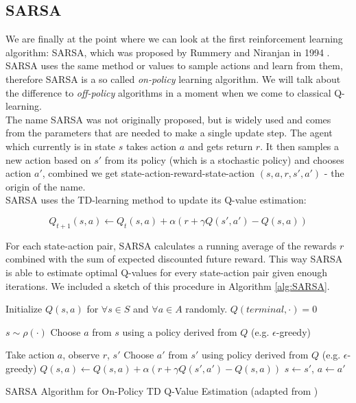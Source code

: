 \subsection{SARSA} \label{ssec:SARSA}
We are finally at the point where we can look at the first reinforcement learning algorithm: SARSA, which was proposed by Rummery and Niranjan in 1994 \cite{rummery1994line}. SARSA uses the same method or values to sample actions and learn from them, therefore SARSA is a so called \textit{on-policy} learning algorithm. We will talk about the difference to \textit{off-policy} algorithms in a moment when we come to classical Q-learning. \\ 
The name SARSA was not originally proposed, but is widely used and comes from the parameters that are needed to make a single update step. The agent which currently is in state $s$ takes action $a$ and gets return $r$. It then samples a new action based on $s'$ from its policy (which is a stochastic policy) and chooses action $a'$, combined we get  state-action-reward-state-action $(s, a, r, s', a')$ - the origin of the name. \\

SARSA uses the TD-learning method to update its Q-value estimation:

\[Q_{t+1}(s, a) \leftarrow Q_t(s, a) + \alpha (r + \gamma Q(s', a') - Q(s, a))\]

For each state-action pair, SARSA calculates a running average of the rewards $r$ combined with the sum of expected discounted future reward. This way SARSA is able to estimate optimal Q-values for every state-action pair given enough iterations. We included a sketch of this procedure in Algorithm \ref{alg:SARSA}.

\begin{algorithm}[ht]
  Initialize $Q(s, a)$ for $\forall s \in S$ and $\forall a \in A$ randomly. $Q(terminal, \cdot) = 0$ \;
   {
   $s \sim \rho(\cdot)$ \;
   Choose $a$ from $s$ using a policy derived from $Q$ (e.g. $\epsilon$-greedy) \;
   
     {
     Take action $a$, observe $r$, $s'$ \;
     Choose $a'$ from $s'$ using policy derived from $Q$ (e.g. $\epsilon$-greedy) \;
     $Q(s, a) \leftarrow Q(s, a) + \alpha (r + \gamma Q(s', a') - Q(s, a))$ \;
     $s \leftarrow s'$, $a \leftarrow a'$ \;
   }
 }
  \caption[The SARSA Algorithm]{SARSA Algorithm for On-Policy TD Q-Value Estimation (adapted from \cite{sutton2018reinforcement})}\label{alg:SARSA}
 \end{algorithm}

